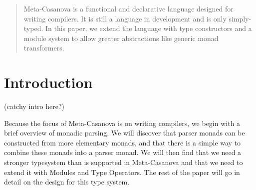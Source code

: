 \begin{abstract}
Meta-Casanova is a functional and declarative language designed for writing compilers. 
It is still a language in development and is only simply-typed.
In this paper, we extend the language with type constructors and a module system to allow greater abstractions like generic monad transformers.
\end{abstract}

\tableofcontents
\pagebreak 

\section{Introduction}
(catchy intro here?)

Because the focus of Meta-Casanova is on writing compilers,
we begin with a brief overview of monadic parsing.
We will discover that parser monads can be constructed from more elementary monads,
and that there is a simple way to combine these monads into a parser monad.
We will then find that we need a stronger typesystem than is supported in Meta-Casanova
and that we need to extend it with Modules and Type Operators.
The rest of the paper will go in detail on the design for this type system.


